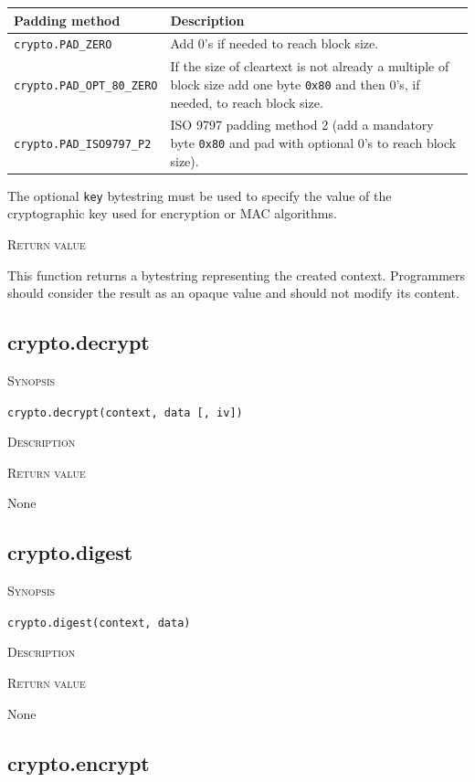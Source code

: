 \documentclass[11pt]{report}
\newcommand{\mansection}[1]{\vspace{0.5em}\par\noindent\textsc{#1}\vspace{0.5em}\par}
\newcommand{\syn}[1]{\texttt{#1}}
\begin{document}
  \vspace{2em}
  \begin{tabular}{|l|p{8cm}|}
  \hline
  \textbf{Padding method}           & \textbf{Description} \\
  \hline
  \hline
  \syn{crypto.PAD\_ZERO}            & Add 0's if needed to reach block size. \\
  \hline
  \syn{crypto.PAD\_OPT\_80\_ZERO}   & If the size of cleartext is not already a multiple of block size
                                      add one byte \texttt{0x80} and then 0's, if needed, to reach block 
                                      size. \\
  \hline
  \syn{crypto.PAD\_ISO9797\_P2}     & ISO 9797 padding method 2 (add a mandatory byte \texttt{0x80} and 
                                      pad with optional 0's to reach block size). \\
  \hline
  \end{tabular}
  \vspace{2em}

  The optional \syn{key} bytestring must be used to specify the value of the cryptographic key used for 
  encryption or MAC algorithms. 

\mansection{Return value}
  This function returns a bytestring representing the created context. Programmers should consider the 
  result as an opaque value and should not modify its content. 

\subsection{crypto.decrypt}

\mansection{Synopsis}
\syn{crypto.decrypt(context, data [, iv])}

\mansection{Description}

\mansection{Return value}
  None

\subsection{crypto.digest}

\mansection{Synopsis}
\syn{crypto.digest(context, data)}

\mansection{Description}

\mansection{Return value}
  None

\subsection{crypto.encrypt}
\end{document}
